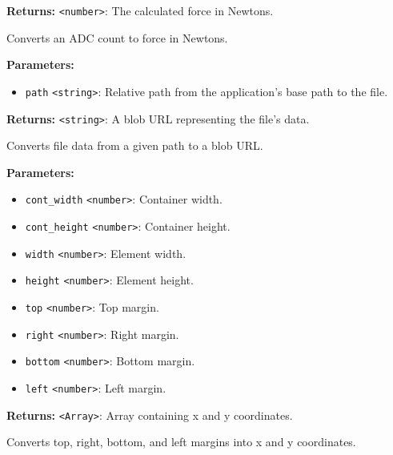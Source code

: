 \documentclass[12pt,a4paper]{article}
\begin{document}
\noindent \textbf{Returns:} \texttt{<number>}: The calculated force in Newtons.

\noindent Converts an ADC count to force in Newtons.

\vspace{5mm}
\noindent {}


\noindent \textbf{Parameters:}
\begin{itemize}
  \item \texttt{path} \texttt{<string>}: Relative path from the application's base path to the file.
\end{itemize}

\noindent \textbf{Returns:} \texttt{<string>}: A blob URL representing the file's data.

\noindent Converts file data from a given path to a blob URL.

\vspace{5mm}
\noindent {}


\noindent \textbf{Parameters:}
\begin{itemize}
  \item \texttt{cont\_width} \texttt{<number>}: Container width.
  \item \texttt{cont\_height} \texttt{<number>}: Container height.
  \item \texttt{width} \texttt{<number>}: Element width.
  \item \texttt{height} \texttt{<number>}: Element height.
  \item \texttt{top} \texttt{<number>}: Top margin.
  \item \texttt{right} \texttt{<number>}: Right margin.
  \item \texttt{bottom} \texttt{<number>}: Bottom margin.
  \item \texttt{left} \texttt{<number>}: Left margin.
\end{itemize}

\noindent \textbf{Returns:} \texttt{<Array>}: Array containing x and y coordinates.

\noindent Converts top, right, bottom, and left margins into x and y coordinates.

\vspace{5mm}
\noindent {}
\end{document}
